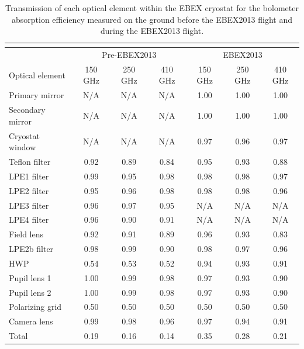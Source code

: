 \documentclass[../EBEXPaper2.tex]{subfiles}
\begin{document}
\begin{table}[htbp]
\caption{Transmission of each optical element within the \ac{EBEX} cryostat for the bolometer absorption efficiency measured on the ground before the \ac{EBEX2013} flight and during the \ac{EBEX2013} flight.}
\begin{center}
\setlength\tabcolsep{3.0pt}
\begin{tabular}{|l||c|c|c||c|c|c|}
\multicolumn{4}{l}{} \\ \hline
& \multicolumn{3}{|c||}{Pre-EBEX2013} & \multicolumn{3}{|c|}{EBEX2013} \\ \hline
Optical element & 150 GHz & 250 GHz & 410 GHz & 150 GHz & 250 GHz & 410 GHz \\ \hline \hline
Primary mirror & N/A & N/A & N/A & 1.00 & 1.00 & 1.00 \\ \hline
Secondary mirror & N/A & N/A & N/A & 1.00 & 1.00 & 1.00 \\ \hline
Cryostat window & N/A & N/A & N/A & 0.97 & 0.96 & 0.97 \\ \hline
Teflon filter  & 0.92 & 0.89 & 0.84 & 0.95 & 0.93 & 0.88 \\ \hline
LPE1 filter    & 0.99 & 0.95 & 0.98 & 0.98 & 0.98 & 0.97 \\ \hline
LPE2 filter    & 0.95 & 0.96 & 0.98 & 0.98 & 0.98 & 0.96 \\ \hline
LPE3 filter    & 0.96 & 0.97 & 0.95 & N/A & N/A & N/A \\ \hline
LPE4 filter    & 0.96 & 0.90 & 0.91 & N/A & N/A & N/A \\ \hline
Field lens     & 0.92 & 0.91 & 0.89 & 0.96 & 0.93 & 0.83 \\ \hline
LPE2b filter  & 0.98 & 0.99 & 0.90 & 0.98 & 0.97 & 0.96 \\ \hline
HWP             & 0.54 & 0.53 & 0.52 & 0.94 & 0.93 & 0.91 \\ \hline
Pupil lens 1  & 1.00 & 0.99 & 0.98 & 0.97 & 0.93 & 0.90 \\ \hline
Pupil lens 2  & 1.00 & 0.99 & 0.98 & 0.97 & 0.93 & 0.90 \\ \hline
Polarizing grid & 0.50 & 0.50 & 0.50 & 0.50 & 0.50 & 0.50 \\ \hline
Camera lens & 0.99 & 0.98 & 0.96 & 0.97 & 0.94 & 0.91 \\ \hline \hline
Total            & 0.19 & 0.16 & 0.14 & 0.35 & 0.28 & 0.21 \\ \hline
\end{tabular}
\end{center}
\label{tab:transmissions}
\end{table}
\end{document}
